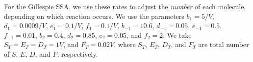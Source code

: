 \documentclass[twocolumn]{revtex4}
\begin{document}
For the Gillespie SSA, we use these rates to adjust the {\em number} of each molecule, depending on which reaction occurs.
%
We use the parameters $b_1=5/V$, $d_1=0.0009/V$, $e_1=0.1/V$, $f_1=0.1/V$, $b_{-1} = 10.6$, $d_{-1}=0.05$, $e_{-1}=0.5$, $f_{-1} =0.01$, $b_2=0.4$, $d_2=0.85$, $e_2=0.05$, and $f_2=2$.
%
We take $S_T=E_T=D_T=1V$, and $F_T=0.02V$, where $S_T$, $E_T$, $D_T$, and $F_T$ are total number of $S$, $E$, $D$, and $F$, respectively.
        
\end{document}
